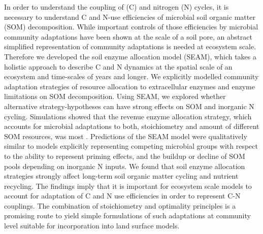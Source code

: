 In order to understand the coupling of  (C) and nitrogen (N)
cycles, it is necessary to understand C and N-use efficiencies of microbial soil
organic matter (SOM) decomposition. While important controls of those
efficiencies by microbial community adaptations have been shown at the scale of
a soil pore, an abstract simplified representation of community adaptations is
needed at ecosystem scale.
Therefore we developed the soil enzyme
allocation model (SEAM), which takes a holistic approach to describe C and N
dynamics at the spatial scale of an ecosystem and time-scales of years and
longer.
We explicitly modelled community adaptation strategies of resource allocation to
extracellular enzymes and enzyme limitations on SOM decomposition. Using SEAM,
we explored whether alternative strategy-hypotheses can have strong effects on
SOM and inorganic N cycling.
Simulations showed that the revenue enzyme allocation strategy, which accounts
for microbial adaptations to both, stoichiometry and amount of different SOM
resources, was most .
Predictions of the SEAM model were qualitatively similar to models explicitly
representing competing microbial groups with respect to the ability to represent
priming effects, and the buildup or decline of SOM pools depending on inorganic
N inputs.
We found that soil enzyme allocation strategies strongly affect  long-term soil organic matter cycling and nutrient recycling. The
findings imply that it is important for ecosystem scale models to account for adaptation
of C and N use efficiencies in order to represent C-N
couplings. The combination of stoichiometry
and optimality principles is a promising route to yield simple formulations of
such adaptations at community level suitable for incorporation into land surface
models.
